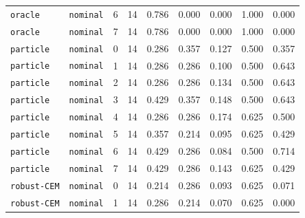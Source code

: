\documentclass{article}
\begin{document}
\begin{center}
\begin{tabular}{llccccccc}
\texttt{oracle} & \texttt{nominal} & 6 & 14 & 0.786 & 0.000 & 0.000 & 1.000 & 0.000 \\
\texttt{oracle} & \texttt{nominal} & 7 & 14 & 0.786 & 0.000 & 0.000 & 1.000 & 0.000 \\
\texttt{particle} & \texttt{nominal} & 0 & 14 & 0.286 & 0.357 & 0.127 & 0.500 & 0.357 \\
\texttt{particle} & \texttt{nominal} & 1 & 14 & 0.286 & 0.286 & 0.100 & 0.500 & 0.643 \\
\texttt{particle} & \texttt{nominal} & 2 & 14 & 0.286 & 0.286 & 0.134 & 0.500 & 0.643 \\
\texttt{particle} & \texttt{nominal} & 3 & 14 & 0.429 & 0.357 & 0.148 & 0.500 & 0.643 \\
\texttt{particle} & \texttt{nominal} & 4 & 14 & 0.286 & 0.286 & 0.174 & 0.625 & 0.500 \\
\texttt{particle} & \texttt{nominal} & 5 & 14 & 0.357 & 0.214 & 0.095 & 0.625 & 0.429 \\
\texttt{particle} & \texttt{nominal} & 6 & 14 & 0.429 & 0.286 & 0.084 & 0.500 & 0.714 \\
\texttt{particle} & \texttt{nominal} & 7 & 14 & 0.429 & 0.286 & 0.143 & 0.625 & 0.429 \\
\texttt{robust-CEM} & \texttt{nominal} & 0 & 14 & 0.214 & 0.286 & 0.093 & 0.625 & 0.071 \\
\texttt{robust-CEM} & \texttt{nominal} & 1 & 14 & 0.286 & 0.214 & 0.070 & 0.625 & 0.000 \\
\bottomrule
\end{tabular}
\end{center}
\end{document}
